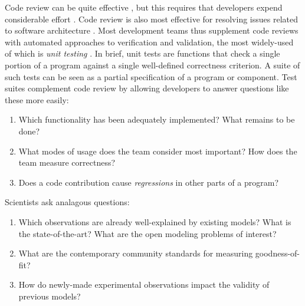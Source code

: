 \documentclass[9pt]{sig-alternate}
\begin{document}
Code review can be quite effective \cite{creffectiveness1,creffectiveness2}, but this requires that developers  expend considerable effort \cite{effort}. Code review is also most effective for resolving  issues related to software architecture \cite{evolvability}. 
Most development teams thus supplement code reviews with {automated} approaches to verification and validation, the most widely-used  of which is \emph{unit testing} \cite{beck2003}. In brief, unit tests are functions that check a single portion of a program against a single well-defined correctness criterion. A suite of such tests can be seen as a partial specification of a program or component.  Test suites complement code review by allowing developers to answer questions like these more easily:
\begin{enumerate}
\item Which functionality has been adequately implemented? What remains to be done?
\item What modes of usage does the team consider most important? How does the team measure correctness?
\item Does a code contribution cause \emph{regressions} in other parts of a program?
\end{enumerate}
Scientists ask analagous questions:
\begin{enumerate}
\item Which observations are already well-explained by existing models? What is the state-of-the-art? What are the open modeling problems of interest?
\item What are the contemporary community standards for measuring goodness-of-fit?
\item How do newly-made experimental observations impact the validity of previous models?
\end{enumerate}
\end{document}
